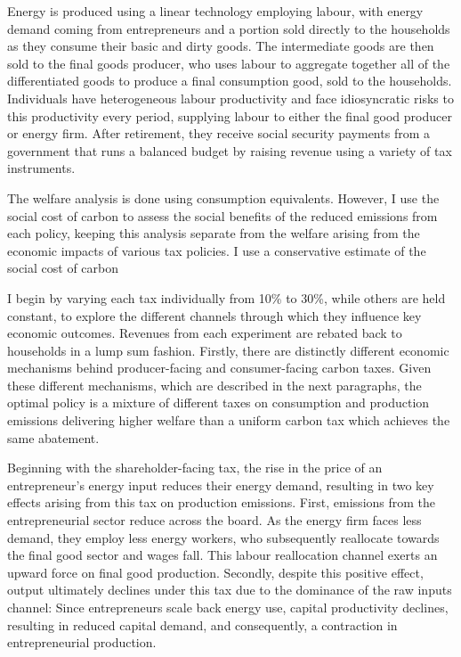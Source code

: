 \documentclass[12pt,a4paper]{article}
\begin{document}
\hspace*{6mm} Energy is produced using a linear technology employing labour, with energy demand coming from entrepreneurs and a portion sold directly to the households as they consume their basic and dirty goods. The intermediate goods are then sold to the final goods producer, who uses labour to aggregate together all of the differentiated goods to produce a final consumption good, sold to the households. Individuals have heterogeneous labour productivity and face idiosyncratic risks to this productivity every period, supplying labour to either the final good producer or energy firm. After retirement, they receive social security payments from a government that runs a balanced budget by raising revenue using a variety of tax instruments. 

\hspace*{6mm} The welfare analysis is done using consumption equivalents. However, I use the social cost of carbon to assess the social benefits of the reduced emissions from each policy, keeping this analysis separate from the  welfare arising from the economic impacts of various tax policies. I use a conservative estimate of the social cost of carbon

\hspace*{6mm} I begin by varying each tax individually from 10\% to 30\%, while others are held constant, to explore the different channels through which they influence key economic outcomes. Revenues from each experiment are rebated back to households in a lump sum fashion. Firstly, there are distinctly different economic mechanisms behind producer-facing and consumer-facing carbon taxes. Given these different mechanisms, which are described in the next paragraphs, the optimal policy  is a mixture of different taxes on consumption and production emissions delivering higher welfare than a uniform carbon tax which achieves the same abatement.

\hspace*{6mm} Beginning with the shareholder-facing tax, the rise in the price of an entrepreneur's energy input reduces their energy demand, resulting in two key effects arising from this tax on production emissions. First, emissions from the entrepreneurial sector reduce across the board. As the energy firm faces less demand, they employ less energy workers, who subsequently reallocate towards the final good sector and wages fall. This labour reallocation channel exerts an upward force on final good production. Secondly, despite this positive effect, output ultimately declines under this tax due to the dominance of the raw inputs channel: Since entrepreneurs scale back energy use, capital productivity declines, resulting in reduced capital demand, and consequently, a contraction in entrepreneurial production. 
\end{document}
